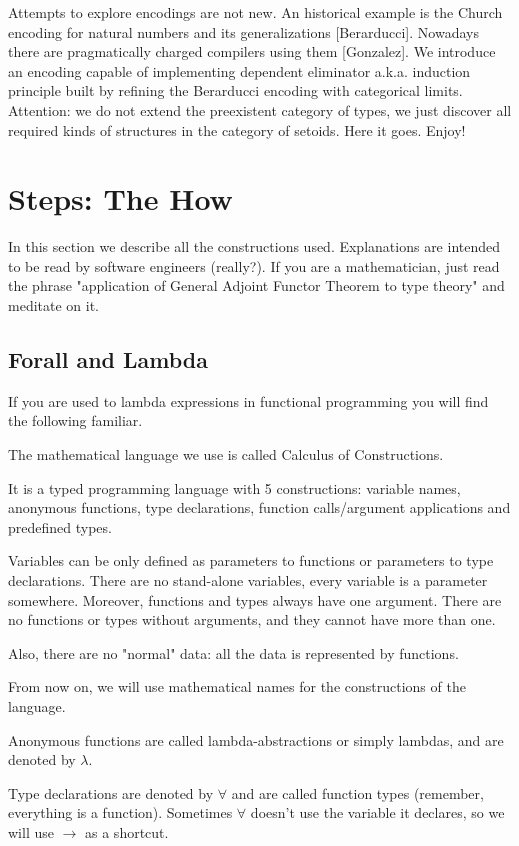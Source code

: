 \documentclass[11pt,oneside]{article}
\begin{document}
Attempts to explore encodings are not new. An historical example is the
Church encoding for natural numbers and its generalizations [Berarducci].
Nowadays there are pragmatically charged compilers using them [Gonzalez].
We introduce an encoding capable of implementing dependent eliminator a.k.a.
induction principle built by refining the Berarducci encoding with categorical limits.
Attention: we do not extend the preexistent category of types,
we just discover all required kinds of structures in the category of setoids.
Here it goes. Enjoy!

\newpage
\section{Steps: The How}

In this section we describe all the constructions used.
Explanations are intended to be read by software engineers (really?).
If you are a mathematician, just read the phrase
"application of General Adjoint Functor Theorem to type theory" and meditate on it.

\subsection{Forall and Lambda}

If you are used to lambda expressions in functional programming
you will find the following familiar.

The mathematical language we use is called Calculus of Constructions.

It is a typed programming language with 5 constructions: variable names, anonymous functions,
type declarations, function calls/argument applications and predefined types.

Variables can be only defined as parameters to functions or parameters to type declarations.
There are no stand-alone variables, every variable is a parameter somewhere. Moreover,
functions and types always have one argument. There are no functions or types without arguments,
and they cannot have more than one.

Also, there are no "normal" data: all the data is represented by functions.

From now on, we will use mathematical names for the constructions of the language.

Anonymous functions are called lambda-abstractions or simply lambdas,
and are denoted by  $\lambda$.

Type declarations are denoted by $\forall$ and are called function types
(remember, everything is a function). Sometimes $\forall$ doesn't use the variable it declares,
so we will use $\rightarrow$ as a shortcut.
\end{document}
